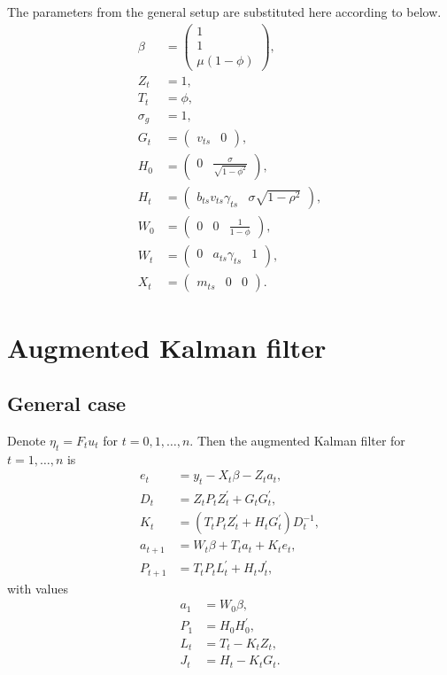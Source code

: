 \documentclass{article}
\begin{document}
The parameters from the general setup are substituted here according to below.
\begin{align*}
\beta & = \begin{pmatrix} 1 \\ 1 \\ \mu(1-\phi) \end{pmatrix}, \\
Z_t & = 1, \\
T_t & = \phi, \\
\sigma_g & = 1, \\
G_t & = \begin{pmatrix} v_{ts} & 0 \end{pmatrix}, \\
H_0 & = \begin{pmatrix} 0 & \frac{\sigma}{\sqrt{1-\phi^2}} \end{pmatrix}, \\
H_t & = \begin{pmatrix} b_{ts}v_{ts}\gamma_{ts} & \sigma\sqrt{1-\rho^2} \end{pmatrix}, \\
W_0 & = \begin{pmatrix} 0 & 0 & \frac1{1-\phi} \end{pmatrix}, \\
W_t & = \begin{pmatrix} 0 & a_{ts}\gamma_{ts} & 1 \end{pmatrix}, \\
X_t & = \begin{pmatrix} m_{ts} & 0 & 0 \end{pmatrix}.
\end{align*}

\section{Augmented Kalman filter}

\subsection{General case}

Denote $\eta_t=F_tu_t$ for $t=0,1,\dots,n$. Then the augmented Kalman filter for $t=1,\dots,n$ is
\begin{align*}
e_t & = y_t-X_t\beta-Z_ta_t, \\
D_t & = Z_tP_tZ_t^\prime+G_tG_t^\prime, \\
K_t & = (T_tP_tZ_t^\prime+H_tG_t^\prime)D_t^{-1}, \\
a_{t+1} & = W_t\beta+T_ta_t+K_te_t, \\
P_{t+1} & = T_tP_tL_t^\prime+H_tJ_t^\prime,
\end{align*}
with values
\begin{align*}
a_1 & = W_0\beta, \\
P_1 & = H_0H_0^\prime, \\
L_t & = T_t-K_tZ_t, \\
J_t & = H_t-K_tG_t.
\end{align*}
\end{document}
